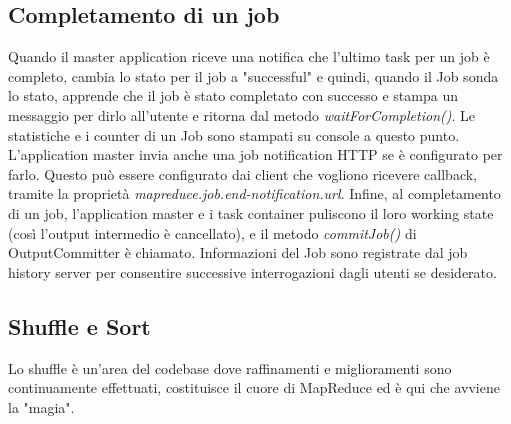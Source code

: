 \subsection{Completamento di un job}
Quando il master application riceve una notifica che l'ultimo task per un job è completo, cambia lo stato per il job a "successful" e quindi, quando il Job sonda lo stato, apprende che il job è stato completato con successo e stampa un messaggio per dirlo all'utente e ritorna dal metodo \textit{waitForCompletion()}. Le statistiche e i counter di un Job sono stampati su console a questo punto. L'application master invia anche una job notification HTTP se è configurato per farlo. Questo può essere configurato dai client che vogliono ricevere callback, tramite la proprietà \textit{mapreduce.job.end-notification.url}. Infine, al completamento di un job, l'application master e i task container puliscono il loro working state (così l'output intermedio è cancellato), e il metodo \textit{commitJob()} di OutputCommitter è chiamato. Informazioni del Job sono registrate dal job history server per consentire successive interrogazioni dagli utenti se desiderato.
\subsection{Shuffle e Sort}
Lo shuffle è un'area del codebase dove raffinamenti e miglioramenti sono continuamente effettuati, costituisce il cuore di MapReduce ed è qui che avviene la "magia".
